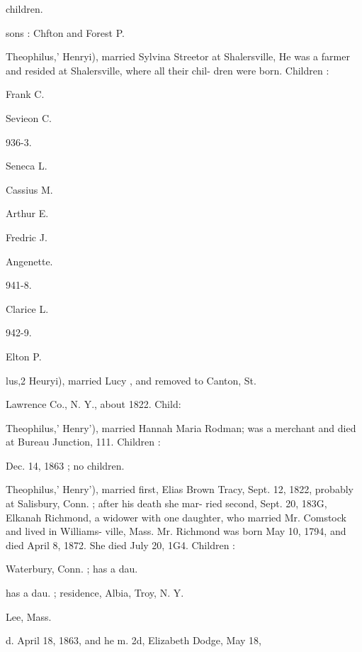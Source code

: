 \documentclass[oneside]{book}
\begin{document}
children. 


sons : Chfton and Forest P. 


Theophilus,' Henryi), married Sylvina Streetor at Shalersville, 
He was a farmer and resided at Shalersville, where all their chil- 
dren were born. Children : 





Frank C. 




Sevieon C. 


936-3. 


Seneca L. 




Cassius M. 




Arthur E. 




Fredric J. 




Angenette. 


941-8. 


Clarice L. 


942-9. 


Elton P. 




lus,2 Heuryi), married Lucy , and removed to Canton, St. 

Lawrence Co., N. Y., about 1822. Child: 







Theophilus,' Henry'), married Hannah Maria Rodman; was a 
merchant and died at Bureau Junction, 111. Children : 




Dec. 14, 1863 ; no children. 

Theophilus,' Henry'), married first, Elias Brown Tracy, Sept. 
12, 1822, probably at Salisbury, Conn. ; after his death she mar- 
ried second, Sept. 20, 183G, Elkanah Richmond, a widower with 
one daughter, who married Mr. Comstock and lived in Williams- 
ville, Mass. Mr. Richmond was born May 10, 1794, and died 
April 8, 1872. She died July 20, 1G4. Children : 






Waterbury, Conn. ; has a dau. 


has a dau. ; residence, Albia, Troy, N. Y. 


Lee, Mass. 


d. April 18, 1863, and he m. 2d, Elizabeth Dodge, May 18, 
\end{document}
